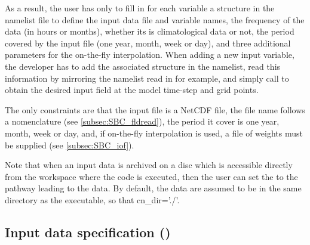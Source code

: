 \documentclass[../main/NEMO_manual]{subfiles}
\begin{document}
As a result, the user has only to fill in for each variable a structure in the namelist file to
define the input data file and variable names, the frequency of the data (in hours or months),
whether its is climatological data or not, the period covered by the input file (one year, month, week or day),
and three additional parameters for the on-the-fly interpolation.
When adding a new input variable, the developer has to add the associated structure in the namelist,
read this information by mirroring the namelist read in  for example,
and simply call  to obtain the desired input field at the model time-step and grid points.

The only constraints are that the input file is a NetCDF file, the file name follows a nomenclature
(see \autoref{subsec:SBC_fldread}), the period it cover is one year, month, week or day, and,
if on-the-fly interpolation is used, a file of weights must be supplied (see \autoref{subsec:SBC_iof}).

Note that when an input data is archived on a disc which is accessible directly from the workspace where
the code is executed, then the user can set the  to the pathway leading to the data.
By default, the data are assumed to be in the same directory as the executable, so that cn\_dir='./'.

\subsection[Input data specification (\textit{fldread.F90})]{Input data specification (\protect{})}
\label{subsec:SBC_fldread}
\end{document}
